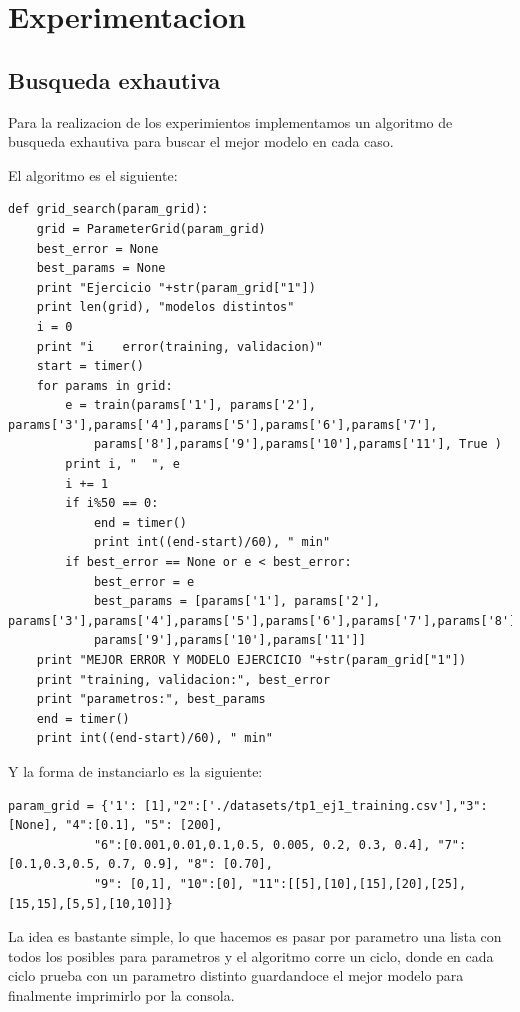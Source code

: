 \section{Experimentacion}
\subsection{Busqueda exhautiva}
Para la realizacion de los experimientos implementamos un algoritmo de busqueda exhautiva para buscar el mejor modelo en cada caso. 

El algoritmo es el siguiente:

\begin{lstlisting}[caption=grid\_search]
def grid_search(param_grid):
	grid = ParameterGrid(param_grid)
	best_error = None
	best_params = None
	print "Ejercicio "+str(param_grid["1"])
	print len(grid), "modelos distintos"
	i = 0
	print "i 	error(training, validacion)"
	start = timer()
	for params in grid:
	    e = train(params['1'], params['2'], params['3'],params['4'],params['5'],params['6'],params['7'],
	    	params['8'],params['9'],params['10'],params['11'], True )
	    print i, "	", e
	    i += 1
	    if i%50 == 0:
	    	end = timer()
	    	print int((end-start)/60), " min"
	    if best_error == None or e < best_error:
	    	best_error = e
	    	best_params = [params['1'], params['2'], params['3'],params['4'],params['5'],params['6'],params['7'],params['8'],
	    	params['9'],params['10'],params['11']]
	print "MEJOR ERROR Y MODELO EJERCICIO "+str(param_grid["1"])
	print "training, validacion:", best_error
	print "parametros:", best_params
	end = timer()
	print int((end-start)/60), " min"
\end{lstlisting}

Y la forma de instanciarlo es la siguiente:

\begin{lstlisting}[caption=Instanciacion]
param_grid = {'1': [1],"2":['./datasets/tp1_ej1_training.csv'],"3": [None], "4":[0.1], "5": [200], 
			"6":[0.001,0.01,0.1,0.5, 0.005, 0.2, 0.3, 0.4], "7":[0.1,0.3,0.5, 0.7, 0.9], "8": [0.70], 
			"9": [0,1], "10":[0], "11":[[5],[10],[15],[20],[25],[15,15],[5,5],[10,10]]}
\end{lstlisting}

La idea es bastante simple, lo que hacemos es pasar por parametro una lista con todos los posibles para parametros y el algoritmo corre un ciclo, donde en cada ciclo prueba con un parametro distinto guardandoce el mejor modelo para finalmente imprimirlo por la consola.

